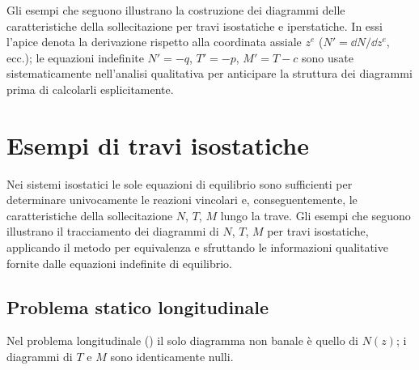 Gli esempi che seguono illustrano la costruzione
dei diagrammi delle caratteristiche della
sollecitazione per travi isostatiche e iperstatiche.
In essi l'apice denota la derivazione
rispetto alla coordinata assiale $z^e$
($N' = \dd N/\dd z^e$, ecc.); le equazioni indefinite
$N' = -q$, $T' = -p$, $M' = T - c$ sono
usate sistematicamente nell'analisi qualitativa
per anticipare la struttura dei diagrammi prima
di calcolarli esplicitamente.


\section{Esempi di travi isostatiche}

Nei sistemi isostatici le sole equazioni di equilibrio
sono sufficienti per determinare univocamente le
reazioni vincolari e, conseguentemente, le
caratteristiche della sollecitazione $N$, $T$, $M$
lungo la trave. Gli esempi che seguono illustrano
il tracciamento dei diagrammi di $N$, $T$, $M$
per travi isostatiche, applicando il metodo per
equivalenza e sfruttando le informazioni qualitative
fornite dalle equazioni indefinite di equilibrio.




\subsection{Problema statico longitudinale}
\label{sec:esempi_longitudinale}

Nel problema longitudinale ()
il solo diagramma non banale è quello di $N(z)$;
i diagrammi di $T$ e $M$ sono identicamente nulli.

